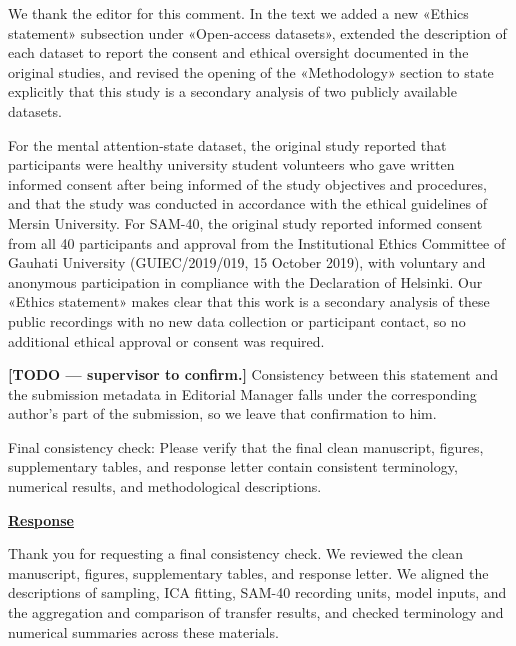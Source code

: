 \documentclass{article}
\begin{document}
We thank the editor for this comment. In the text we added a new
«Ethics statement» subsection under «Open-access datasets»,
extended the description of each dataset to report the consent and ethical
oversight documented in the original studies, and revised the opening of the
«Methodology» section to state explicitly that this study is a
secondary analysis of two publicly available datasets.

For the mental attention-state dataset, the original study reported that
participants were healthy university student volunteers who gave written
informed consent after being informed of the study objectives and
procedures, and that the study was conducted in accordance with the ethical
guidelines of Mersin University. For SAM-40, the original study reported
informed consent from all 40 participants and approval from the Institutional
Ethics Committee of Gauhati University (GUIEC/2019/019, 15 October 2019),
with voluntary and anonymous participation in compliance with the
Declaration of Helsinki. Our «Ethics statement» makes clear that this work is a
secondary analysis of these public recordings with no new data collection or
participant contact, so no additional ethical approval or consent was
required.

\textbf{[TODO --- supervisor to confirm.]} Consistency between this statement
and the submission metadata in Editorial Manager falls under the
corresponding author's part of the submission, so we leave that confirmation
to him.

\vspace{0.3cm}


\begin{cmt}{}{}

Final consistency check: Please verify that the final clean manuscript, figures,
supplementary tables, and response letter contain consistent terminology,
numerical results, and methodological descriptions.

\end{cmt}
\vspace{0.1cm}
\noindent
\underline{\textbf{Response}}
\vspace{0.2cm}

Thank you for requesting a final consistency check. We reviewed the clean
manuscript, figures, supplementary tables, and response letter. We aligned the descriptions of
sampling, ICA fitting, SAM-40 recording units, model inputs, and the aggregation
and comparison of transfer results, and checked terminology and numerical
summaries across these materials.

\vspace{0.3cm}
\end{document}
